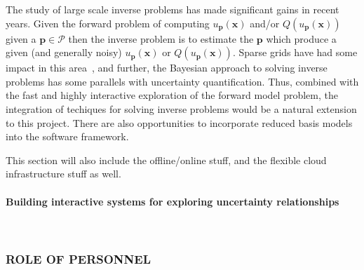 \documentclass[a4paper,fontsize=12pt]{scrartcl}
\begin{document}
The study of large scale inverse problems has made significant gains in recent years. Given the forward problem of computing $u_{\mathbf{p}}(\mathbf{x})$ and/or $Q(u_{\mathbf{p}}(\mathbf{x}))$ given a $\mathbf{p}\in\mathcal{P}$ then the inverse problem is to estimate the $\mathbf{p}$ which produce a given (and generally noisy) $u_{\mathbf{p}}(\mathbf{x})$ or $Q(u_{\mathbf{p}}(\mathbf{x}))$.
Sparse grids have had some impact in this area~\parencite{Zabaras2010}, and further, the Bayesian approach to solving inverse problems has some parallels with uncertainty quantification.
Thus, combined with the fast and highly interactive exploration of the forward model problem, the integration of techiques for solving inverse problems would be a natural extension to this project.
There are also opportunities to incorporate reduced basis models~\parencite{LiebermanEtal2010,Peherstorfer2013,ChenSchwab2015} into the software framework.















This section will also include the offline/online stuff, and the
flexible cloud infrastructure stuff as well.

\paragraph*{Building interactive systems for exploring uncertainty relationships}\mbox{}\\



\subsubsection*{ROLE OF PERSONNEL}
\end{document}
